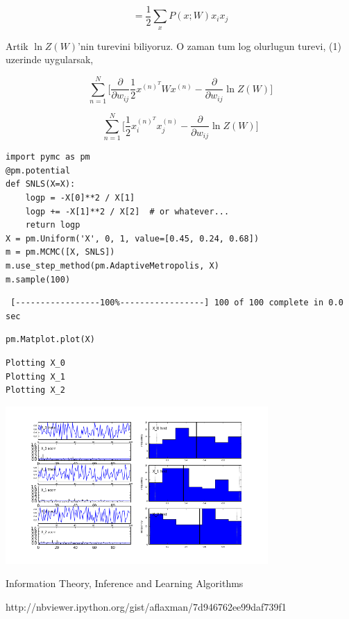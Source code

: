 \documentclass[12pt,fleqn]{article}\usepackage{../common}
\begin{document}
$$ 
= 
\frac{1}{2}  \sum_x P(x;W) x_i x_j
 $$

Artik $\ln Z(W)$'nin turevini biliyoruz. O zaman tum log olurlugun turevi,
(1) uzerinde uygularsak,

$$  
\sum _{n=1}^{N} \bigg[ \frac{\partial}{\partial w_{ij}}  \frac{1}{2} x^{(n)^T} W x^{(n)} - 
\frac{\partial}{\partial w_{ij}}  \ln Z(W) \bigg]
$$


$$  
\sum _{n=1}^{N} 
\bigg[ 
\frac{1}{2} x_i^{(n)^T}x_j^{(n)} - 
\frac{\partial}{\partial w_{ij}}  \ln Z(W) 
\bigg]
$$


\begin{verbatim}
import pymc as pm
@pm.potential
def SNLS(X=X):
    logp = -X[0]**2 / X[1]
    logp += -X[1]**2 / X[2]  # or whatever...
    return logp
X = pm.Uniform('X', 0, 1, value=[0.45, 0.24, 0.68])
m = pm.MCMC([X, SNLS])
m.use_step_method(pm.AdaptiveMetropolis, X)
m.sample(100)
\end{verbatim}

\begin{verbatim}
 [-----------------100%-----------------] 100 of 100 complete in 0.0 sec
\end{verbatim}

\begin{verbatim}
pm.Matplot.plot(X)
\end{verbatim}

\begin{verbatim}
Plotting X_0
Plotting X_1
Plotting X_2
\end{verbatim}


\includegraphics[height=6cm]{X_2.png}




Information Theory, Inference and Learning Algorithms

http://nbviewer.ipython.org/gist/aflaxman/7d946762ee99daf739f1
\end{document}
